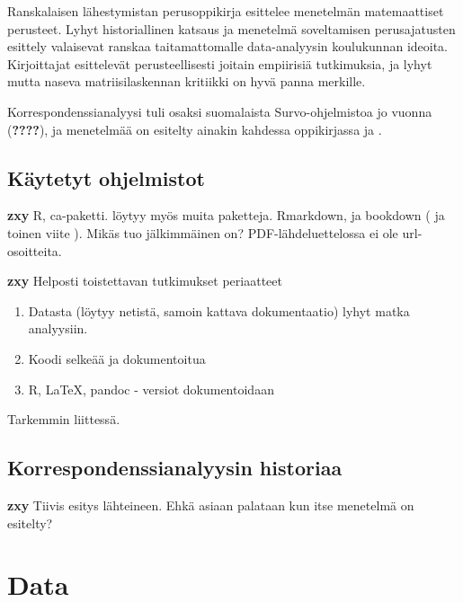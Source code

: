 \documentclass[finnish,]{book}
\providecommand{\tightlist}{%
  \setlength{\itemsep}{0pt}\setlength{\parskip}{0pt}}
\theoremstyle{definition}
\theoremstyle{definition}
\theoremstyle{definition}
\theoremstyle{remark}
\begin{document}
Ranskalaisen lähestymistan
perusoppikirja\citep{RefWorks:doc:5a857a43e4b0ed2d44664d75} esittelee
menetelmän matemaattiset perusteet. Lyhyt historiallinen katsaus ja
menetelmä soveltamisen perusajatusten esittely valaisevat ranskaa
taitamattomalle data-analyysin koulukunnan ideoita. Kirjoittajat
esittelevät perusteellisesti joitain empiirisiä tutkimuksia, ja lyhyt
mutta naseva matriisilaskennan kritiikki on hyvä panna merkille.

Korrespondenssianalyysi tuli osaksi suomalaista Survo-ohjelmistoa jo
vuonna (\textbf{????}), ja menetelmää on esitelty ainakin kahdessa
oppikirjassa\citep{RefWorks:doc:5a857a44e4b0ed2d44664d95} ja
\citep{RefWorks:doc:5a857a44e4b0ed2d44664da4}.

\hypertarget{kaytetyt-ohjelmistot}{%
\section{Käytetyt ohjelmistot}\label{kaytetyt-ohjelmistot}}

\textbf{zxy} R, ca-paketti. löytyy myös muita paketteja.
Rmarkdown\citep{RefWorks:doc:5b6b346fe4b0c619b11b8a3e}, ja bookdown
(\citep{RefWorks:doc:5b6b36dde4b09b7ec442bf8b} ja toinen viite
\citep{R-bookdown}). Mikäs tuo jälkimmäinen on? PDF-lähdeluettelossa ei
ole url-osoitteita.

\textbf{zxy} Helposti toistettavan tutkimukset periaatteet

\begin{enumerate}
\def\labelenumi{\arabic{enumi}.}
\tightlist
\item
  Datasta (löytyy netistä, samoin kattava dokumentaatio) lyhyt matka
  analyysiin.
\item
  Koodi selkeää ja dokumentoitua
\item
  R, LaTeX, pandoc - versiot dokumentoidaan
\end{enumerate}

Tarkemmin liittessä.

\hypertarget{korrespondenssianalyysin-historiaa}{%
\section{Korrespondenssianalyysin
historiaa}\label{korrespondenssianalyysin-historiaa}}

\textbf{zxy} Tiivis esitys lähteineen. Ehkä asiaan palataan kun itse
menetelmä on esitelty?

\hypertarget{data}{%
\chapter{Data}\label{data}}
\end{document}
